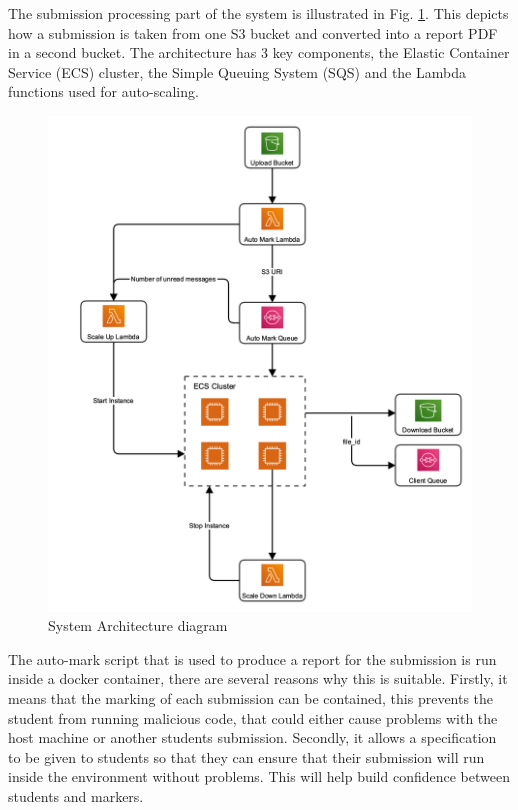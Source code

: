 \documentclass[runningheads]{llncs}
\begin{document}
The submission processing part of the system is illustrated in Fig. \ref{fig:architecture}. This depicts how a submission is taken from one S3 bucket and converted into a report PDF in a second bucket. The architecture has 3 key components, the Elastic Container Service (ECS) cluster, the Simple Queuing System (SQS) and the Lambda functions used for auto-scaling. 

\begin{figure}[ht]
\vspace{-1em}
    \centering
    \includegraphics[scale=0.18]{architecture-diagrams/architecture-6.png}
    \vspace{-1em}
    \caption{System Architecture diagram}
    \label{fig:architecture}
    \vspace{-1em}
\end{figure}

The auto-mark script that is used to produce a report for the submission is run inside a docker container, there are several reasons why this is suitable. Firstly, it means that the marking of each submission can be contained, this prevents the student from running malicious code, that could either cause problems with the host machine or another students submission. Secondly, it allows a specification to be given to students so that they can ensure that their submission will run inside the environment without problems. This will help build confidence between students and markers.
\end{document}
